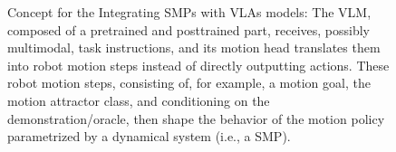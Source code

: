 \begin{figure}[ht]
    \caption{Concept for the Integrating \glspl{SMP} with \glspl{VLA} models: The \gls{VLM}, composed of a pretrained and posttrained part, receives, possibly multimodal, task instructions, and its motion head translates them into robot motion steps instead of directly outputting actions. These robot motion steps, consisting of, for example, a motion goal, the motion attractor class, and conditioning on the demonstration/oracle, then shape the behavior of the motion policy parametrized by a dynamical system (i.e., a \gls{SMP}).}
    \label{fig:conclusion:future_work:integrating_smps_with_vlas}
\end{figure}

